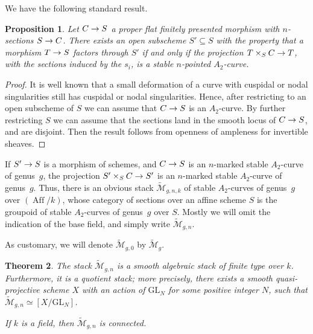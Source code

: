 \documentclass[a4paper, 10pt]{amsart}
\numberwithin{equation}{section}
\numberwithin{subsection}{section}
\newtheorem{theorem}{Theorem}[section]
\newtheorem{proposition}[theorem]{Proposition}
\theoremstyle{definition}
\theoremstyle{remark}
\renewcommand{\mathcal}{\mathscr}
\newcommand\arr{\ifinner\to\else\longrightarrow\fi}
\newcommand{\GL}{\mathrm{GL}}
\newcommand{\aff}[1][k]{(\operatorname{Aff}/#1)}
\newcommand{\mt}{\widetilde{\mathcal M}}
\newcommand{\modangelo}{\marginpar{}}
\begin{document}
	We have the following standard result.
	
	\begin{proposition}\label{prop:openness}
		Let $C \arr S$ a proper flat finitely presented morphism with $n$-sections $S \arr C$. There exists an open subscheme $S' \subseteq S$ with the property that a morphism $T \arr S$ factors through $S'$ if and only if the projection $T\times_{S} C \arr T$, with the sections induced by the $s_{i}$, is a stable $n$-pointed $A_{2}$-curve.
	\end{proposition}
	
	\begin{proof}
	\modangelo It is well known that a small deformation of a curve with cuspidal or nodal singularities still has cuspidal or nodal singularities. Hence, after restricting to an open subscheme of $S$ we can assume that $C \arr S$ is an $A_{2}$-curve. By further restricting $S$ we can assume that the sections land in the smooth locus of $C \arr S$, and are disjoint. Then the result follows from openness of ampleness for invertible sheaves. 
	\end{proof}
	
	If $S' \arr S$ is a morphism of schemes, and $C \arr S$ is an $n$-marked stable $A_2$-curve of genus~$g$, the projection $S'\times_{S}C \arr S'$ is an $n$-marked stable $A_2$-curve of genus~$g$. Thus, there is an obvious stack $\mt_{g,n, k}$ of stable $A_2$-curves of genus~$g$ over $\aff$, whose category of sections over an affine scheme $S$ is the groupoid of stable $A_2$-curves of genus~$g$ over $S$. Mostly we will omit the indication of the base field, and simply write $\mt_{g,n}$.
	
	As customary, we will denote $\mt_{g,0}$ by $\mt_{g}$.
	
	
	\begin{theorem}\label{thm:quotient-stack}
		The stack $\mt_{g,n}$ is a smooth algebraic stack of finite type over $k$. Furthermore, it is a quotient stack; more precisely, there exists a smooth quasi-projective scheme $X$ with an action of $\GL_{N}$ for some positive integer $N$, such that $\mt_{g,n} \simeq [X/\GL_{N}]$.
		
		If $k$ is a field, then $\mt_{g,n}$ is connected.
	\end{theorem}
	
\end{document}
